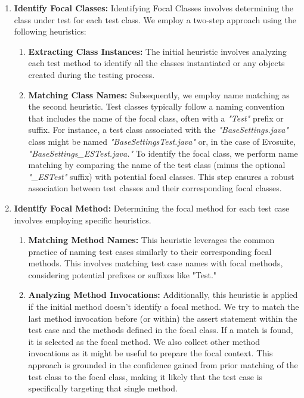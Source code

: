 \begin{enumerate}
    \item \textbf{Identify Focal Classes:} Identifying Focal Classes involves determining the class under test for each test class. We employ a two-step approach using the following heuristics:
        \begin{enumerate}
            \item \textbf{Extracting Class Instances:} The initial heuristic involves analyzing each test method to identify all the classes instantiated or any objects created during the testing process.
            \item \textbf{Matching Class Names:} Subsequently, we employ name matching as the second heuristic. Test classes typically follow a naming convention that includes the name of the focal class, often with a \textit{"Test"} prefix or suffix. For instance, a test class associated with the \textit{"BaseSettings.java"} class might be named \textit{"BaseSettingsTest.java"} or, in the case of Evosuite, \textit{"BaseSettings\_ESTest.java."} To identify the focal class, we perform name matching by comparing the name of the test class (minus the optional \textit{"\_ESTest"} suffix) with potential focal classes. This step ensures a robust association between test classes and their corresponding focal classes.
        \end{enumerate}

    \item \textbf{Identify Focal Method:} Determining the focal method for each test case involves employing specific heuristics. 
  \begin{enumerate}
      \item \textbf{Matching Method Names:} This heuristic leverages the common practice of naming test cases similarly to their corresponding focal methods. This involves matching test case names with focal methods, considering potential prefixes or suffixes like "Test."
      \item \textbf{Analyzing Method Invocations:} Additionally, this heuristic is applied if the initial method doesn't identify a focal method. We try to match the last method invocation before (or within) the assert statement within the test case and the methods defined in the focal class. If a match is found, it is selected as the focal method. We also collect other method invocations as it might be useful to prepare the focal context. This approach is grounded in the confidence gained from prior matching of the test class to the focal class, making it likely that the test case is specifically targeting that single method.
  \end{enumerate}


\end{enumerate}
